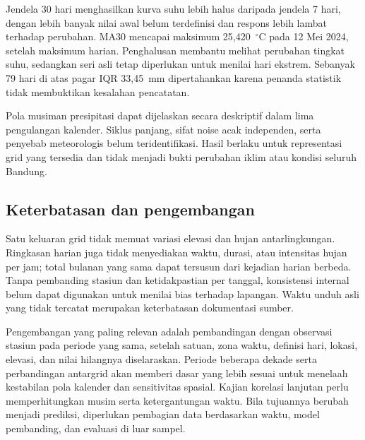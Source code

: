 \documentclass[12pt,a4paper]{article}
\begin{document}
Jendela 30 hari menghasilkan kurva suhu lebih halus daripada jendela 7 hari, dengan lebih banyak nilai awal belum terdefinisi dan respons lebih lambat terhadap perubahan. MA30 mencapai maksimum 25,420~$^\circ$C pada 12 Mei 2024, setelah maksimum harian. Penghalusan membantu melihat perubahan tingkat suhu, sedangkan seri asli tetap diperlukan untuk menilai hari ekstrem. Sebanyak 79 hari di atas pagar IQR 33,45~mm dipertahankan karena penanda statistik tidak membuktikan kesalahan pencatatan.

Pola musiman presipitasi dapat dijelaskan secara deskriptif dalam lima pengulangan kalender. Siklus panjang, sifat noise acak independen, serta penyebab meteorologis belum teridentifikasi. Hasil berlaku untuk representasi grid yang tersedia dan tidak menjadi bukti perubahan iklim atau kondisi seluruh Bandung.

\subsection{Keterbatasan dan pengembangan}
Satu keluaran grid tidak memuat variasi elevasi dan hujan antarlingkungan. Ringkasan harian juga tidak menyediakan waktu, durasi, atau intensitas hujan per jam; total bulanan yang sama dapat tersusun dari kejadian harian berbeda. Tanpa pembanding stasiun dan ketidakpastian per tanggal, konsistensi internal belum dapat digunakan untuk menilai bias terhadap lapangan. Waktu unduh asli yang tidak tercatat merupakan keterbatasan dokumentasi sumber.

Pengembangan yang paling relevan adalah pembandingan dengan observasi stasiun pada periode yang sama, setelah satuan, zona waktu, definisi hari, lokasi, elevasi, dan nilai hilangnya diselaraskan. Periode beberapa dekade serta perbandingan antargrid akan memberi dasar yang lebih sesuai untuk menelaah kestabilan pola kalender dan sensitivitas spasial. Kajian korelasi lanjutan perlu memperhitungkan musim serta ketergantungan waktu. Bila tujuannya berubah menjadi prediksi, diperlukan pembagian data berdasarkan waktu, model pembanding, dan evaluasi di luar sampel.
\end{document}
